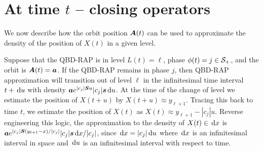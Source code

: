 
\section{At time \(t\) -- closing operators}\label{sec: closing}
We now describe how the orbit position \(\boldsymbol A(t)\) can be used to approximate the density of the position of \(X(t)\) in a given level. 

Suppose that the QBD-RAP is in level \(L(t)=\ell\), phase \(\phi(t)=j\in\mathcal{S}_+\), and the orbit is \(\boldsymbol A(t)=\boldsymbol a\). If the QBD-RAP remains in phase \(j\), then QBD-RAP approximation will transition out of level \(\ell\) in the infinitesimal time interval \(t+\, \mathrm{d} u\) with density \(\boldsymbol a e^{|c_j|\boldsymbol{S}u}|c_j|\boldsymbol s\, \mathrm{d} u\). At the time of the change of level we estimate the position of \(X(t+u)\) by \(X(t+u)\approx y_{\ell+1}\). Tracing this back to time \(t\), we estimate the position of \(X(t)\) as \(X(t)\approx y_{\ell+1} - |c_j|u\). Reverse engineering this logic, the approximation to the density of \(X(t) \in\, \mathrm{d} x\) is \(\boldsymbol a e^{|c_j|\boldsymbol S(y_{\ell+1}-x)/|c_j|}|c_j|\boldsymbol s \, \mathrm{d} x/|c_j|\), since \(\, \mathrm{d} x = |c_j|\, \mathrm{d} u\) where \(\, \mathrm{d} x\) is an infinitesimal interval in space and \(\, \mathrm{d} u\) is an infinitesimal interval with respect to time.


